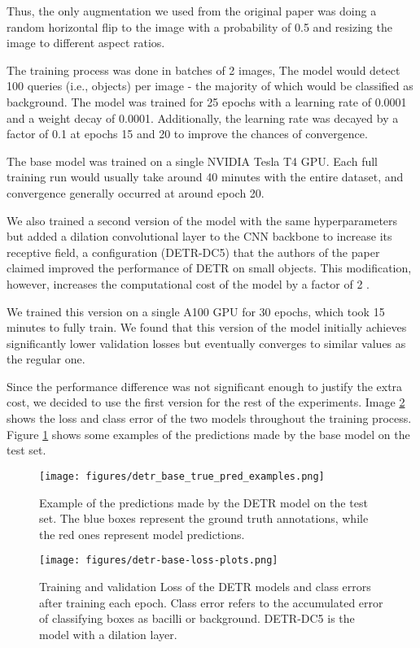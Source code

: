 \documentclass[../main.tex]{subfiles}
\begin{document}
Thus, the only augmentation we used from the original paper was doing a random horizontal flip to the image with a probability of 0.5 and resizing the image to different aspect ratios.

The training process was done in batches of 2 images, The model would detect 100 queries (i.e., objects) per image - the majority of which would be classified as background. The model was trained for 25 epochs with a learning rate of 0.0001 and a weight decay of 0.0001. Additionally, the learning rate was decayed by a factor of 0.1 at epochs 15 and 20 to improve the chances of convergence. 

The base model was trained on a single NVIDIA Tesla T4 GPU. Each full training run would usually take around 40 minutes with the entire dataset, and convergence generally occurred at around epoch 20.

We also trained a second version of the model with the same hyperparameters but added a dilation convolutional layer to the CNN backbone to increase its receptive field, a configuration (DETR-DC5) that the authors of the paper claimed improved the performance of DETR on small objects. This modification, however, increases the computational cost of the model by a factor of 2 \cite{carionEndtoEndObjectDetection2020}.

We trained this version on a single A100 GPU for 30 epochs, which took 15 minutes to fully train. We found that this version of the model initially achieves significantly lower validation losses but eventually converges to similar values as the regular one. 

Since the performance difference was not significant enough to justify the extra cost, we decided to use the first version for the rest of the experiments. Image \ref{fig:loss_plots_detr_base} shows the loss and class error of the two models throughout the training process. Figure \ref{fig:detr_base_true_pred_examples} shows some examples of the predictions made by the base model on the test set.

\begin{figure}[ht]
    \centering
    \texttt{[image: figures/detr\_base\_true\_pred\_examples.png]}
    \caption{Example of the predictions made by the DETR model on the test set. The blue boxes represent the ground truth annotations, while the red ones represent model predictions.}
    \label{fig:detr_base_true_pred_examples}
\end{figure}

\begin{figure}[ht]
    \centering
    \texttt{[image: figures/detr-base-loss-plots.png]}
    \caption{Training and validation Loss of the DETR models and class errors after training each epoch. \footnotesize Class error refers to the accumulated error of classifying boxes as bacilli or background. DETR-DC5 is the model with a dilation layer.}
    \label{fig:loss_plots_detr_base}
\end{figure}
\end{document}
